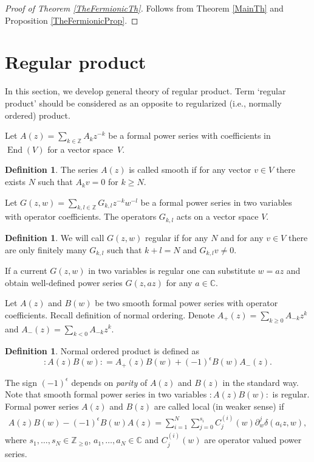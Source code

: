 \documentclass[11pt]{article}
\numberwithin{equation}{section}
\theoremstyle{definition}
\newtheorem{Definition}[Theorem]{Definition}
\DeclareMathOperator{\End}{End}
\begin{document}
\begin{proof}[Proof of Theorem \ref{TheFermionicTh}] Follows from Theorem \ref{MainTh} and Proposition \ref{TheFermionicProp}.
\end{proof}

\setcounter{section}{9}
\setcounter{subsection}{3}
\setcounter{subsubsection}{0}
\setcounter{Theorem}{31}
\setcounter{equation}{25}
\appendix
\section{Regular product} \label{nonorm}

In this section, we develop general theory of regular product. Term `regular product' should be considered as an opposite to regularized (i.e., normally ordered) product.

Let $A(z) = \sum\limits_{k \in \mathbb{Z}} A_k z^{-k}$ be a formal power series with coefficients in $\End(V)$ for a vector space~$V$.
\begin{Definition}
The series $A(z)$ is called smooth if for any vector $v \in V$ there exists $N$ such that $A_k v = 0$ for $k \geqslant N$.
\end{Definition}
Let $G(z,w) = \sum\limits_{k,l \in \mathbb{Z}}G_{k,l} z^{-k} w^{-l}$ be a formal power series in two variables with operator coefficients. The operators $G_{k,l}$ acts on a vector space $V$.
\begin{Definition} \label{def:regular}
We will call $G(z,w)$ regular if for any $N$ and for any $v \in V$ there are only finitely many $G_{k,l}$ such that $k+l=N$ and $G_{k,l} v \neq 0$.
\end{Definition}

If a current $G(z,w)$ in two variables is regular one can substitute $w=az$ and obtain well-defined power series $G(z, az)$ for any $a \in \mathbb{C}$.

Let $A(z)$ and $B(w)$ be two smooth formal power series with operator coefficients. Recall definition of normal ordering. Denote $A_+ (z) = \sum\limits_{k \geqslant 0} A_{-k} z^{k}$ and $A_- (z) = \sum\limits_{k < 0} A_{-k} z^{k}$.

\begin{Definition} \label{def:norm}
Normal ordered product is defined as
\[ {: \! A(z) B(w) \! :} = A_+ (z) B(w) + (-1)^{\epsilon} B(w) A_- (z).\]
\end{Definition}

The sign $(-1)^{\epsilon}$ depends on \emph{parity} of $A(z)$ and $B(z)$ in the standard way. Note that smooth formal power series in two variables $: \! A(z) B(w) \! :$ is regular. Formal power series $A(z)$ and $B(z)$ are called local (in weaker sense) if
\begin{gather} \label{def:weakLocal}
A(z)B(w)-(-1)^{\epsilon} B(w) A(z) = \sum_{i=1}^{N} \sum_{j=0}^{s_i} C_{j}^{(i)} (w) \partial_w^j \delta(a_i z, w),
\end{gather}
where $s_1, \dots, s_N \in \mathbb{Z}_{\geq 0}$, $a_1, \dots, a_N \in \mathbb{C}$ and $C_{j}^{(i)} \! (w)$ are operator valued power series.
\end{document}
